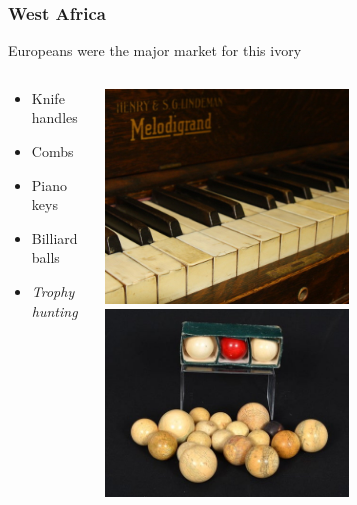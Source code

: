 \documentclass[10pt]{beamer}
\begin{document}
\begin{frame}[t]
\frametitle{West Africa}
\vspace{0.5cm}
	
	Europeans were the major market for this ivory\\
	
	\vspace{0.25cm}
	
	\begin{columns}
		\begin{column}{0.5\textwidth}
			\begin{itemize}
				\item Knife handles
				\item Combs
				\item Piano keys
				\item Billiard balls
				\item \emph{Trophy hunting}
			\end{itemize}
		\end{column}
		
		\begin{column}{0.5\textwidth}
			\begin{center}
				\includegraphics[width=0.6\textwidth]{figures/piano.jpg}\\
				\medskip
				\includegraphics[width=0.6\textwidth]{figures/balls.jpg}\\
			\end{center}
		\end{column}	
	\end{columns}
\end{frame}
\end{document}
